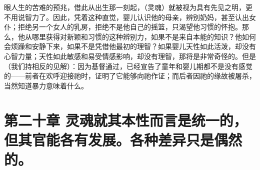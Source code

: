 眼人生的苦难的预兆，借此从出生那一刻起，（灵魂）就被视为具有先见之明，更不用说智力了。因此，凭着这种直觉，婴儿认识他的母亲，辨别奶妈，甚至认出女仆；拒绝另一个女人的乳房，拒绝不是他自己的摇篮，只渴望他习惯的怀抱。那么，他从哪里获得对新颖和习惯的这种辨别力，如果不是来自本能的知识？他如何会烦躁和安静下来，如果不是凭借他最初的理智？如果婴儿天性如此活泼，却没有心智力量；天性如此敏感和易受情感影响，却没有理智，那将是非常奇怪的。但是（我们持相反的见解）：因为基督通过，已经宣告了童年和婴儿期都不是没有感觉的——前者在欢呼迎接祂时，证明了它能够向祂作证；而后者因祂的缘故被屠杀，当然知道暴力意味着什么。\par


\section{第二十章 灵魂就其本性而言是统一的，但其官能各有发展。各种差异只是偶然的。}

